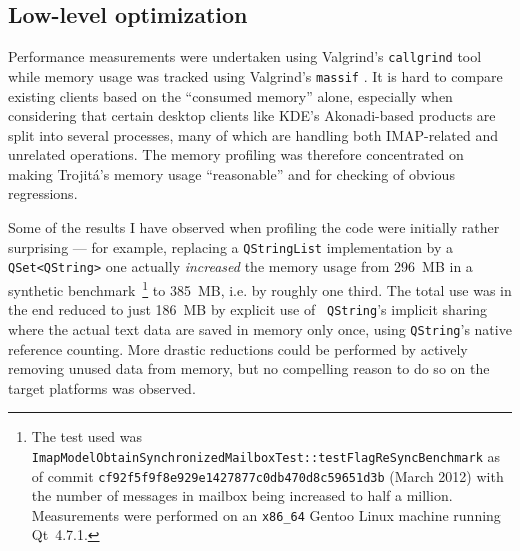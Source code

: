 \documentclass[trojita]{subfiles}
\begin{document}
\subsection{Low-level optimization}

Performance measurements were undertaken using Valgrind's \cite{valgrind} {\tt callgrind} \cite{valgrind-callgrind} tool
while memory usage was tracked using Valgrind's {\tt massif} \cite{valgrind-massif}.  It is hard to compare existing
clients based on the ``consumed memory'' alone, especially when considering that certain desktop clients like KDE's
Akonadi-based \cite{akonadi} products are split into several processes, many of which are handling both IMAP-related and
unrelated operations.  The memory profiling was therefore concentrated on making Trojitá's memory usage ``reasonable''
and for checking of obvious regressions.

Some of the results I have observed when profiling the code were initially rather surprising --- for example, replacing
a {\tt QStringList} implementation by a {\tt QSet<QString>} one actually {\em increased} the memory usage from 296~MB in
a synthetic benchmark~\footnote{The test used was {\tt ImapModelObtainSynchronizedMailboxTest::testFlagReSyncBenchmark}
as of commit {\tt cf92f5f9f8e929e1427877c0db470d8c59651d3b} (March 2012) with the number of messages in mailbox being
increased to half a million.  Measurements were performed on an {\tt x86\_64} Gentoo Linux machine running Qt~4.7.1.} to
385~MB, i.e. by roughly one third.  The total use was in the end reduced to just 186~MB by explicit use of {\tt
QString}'s implicit sharing where the actual text data are saved in memory only once, using {\tt QString}'s native
reference counting.  More drastic reductions could be performed by actively removing unused data from memory, but no
compelling reason to do so on the target platforms was observed.
\end{document}
